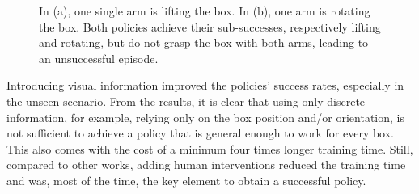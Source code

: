 \documentclass[letterpaper, 10 pt, conference]{ieeeconf}  %
\begin{document}
\begin{figure}[t]
    \centering
    \caption{In (a), one single arm is lifting the box. In (b), one arm is rotating the box. Both policies achieve their sub-successes, respectively lifting and rotating, but do not grasp the box with both arms, leading to an unsuccessful episode.}
    \label{subsuccess-failure}
\end{figure}

Introducing visual information improved the policies' success rates, especially in the unseen scenario. 
From the results, it is clear that using only discrete information, for example, relying only on the box position and/or orientation, is not sufficient to achieve a policy that is general enough to work for every box. 
This also comes with the cost of a minimum four times longer training time.
Still, compared to other works, adding human interventions reduced the training time and was, most of the time, the key element to obtain a successful policy.
\end{document}
